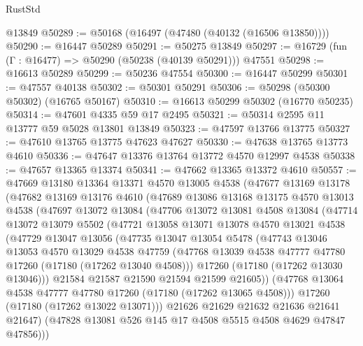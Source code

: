 \begin{lexlean}{RustStd}
\begin{coremodule}
{\begin{coremodule}
{{{{{{{{{{{{{{{{{{{{{{{{{{{{{{{{{{{{{{{{{{{{{{{{{{{{{{{    @13849
@50289 := @50168 (@16497 (@47480 (@40132 (@16506 @13850))))
@50290 := @16447 @50289
@50291 := @50275 @13849
@50297 := @16729 (fun (Γ : @16477) => @50290 (@50238 (@40139 @50291))) @47551
@50298 := @16613 @50289
@50299 := @50236 @47554
@50300 := @16447 @50299
@50301 := @47557 @40138
@50302 := @50301 @50291
@50306 := @50298 (@50300 @50302) (@16765 @50167)
@50310 := @16613 @50299 @50302 (@16770 @50235)
@50314 := @47601 @4335 @59 @17 @2495
@50321 := @50314 @2595 @11 @13777 @59 @5028 @13801 @13849
@50323 := @47597 @13766 @13775
@50327 := @47610 @13765 @13775 @47623 @47627
@50330 := @47638 @13765 @13773 @4610
@50336 := @47647 @13376 @13764 @13772 @4570 @12997 @4538
@50338 := @47657 @13365 @13374
@50341 := @47662 @13365 @13372 @4610
@50557 := @47669
    @13180
    @13364
    @13371
    @4570
    @13005
    @4538
    (@47677
      @13169
      @13178
      (@47682
        @13169
        @13176
        @4610
        (@47689
          @13086
          @13168
          @13175
          @4570
          @13013
          @4538
          (@47697
            @13072
            @13084
            (@47706
              @13072
              @13081
              @4508
              @13084
              (@47714
                @13072
                @13079
                @5502
                (@47721
                  @13058
                  @13071
                  @13078
                  @4570
                  @13021
                  @4538
                  (@47729
                    @13047
                    @13056
                    (@47735
                      @13047
                      @13054
                      @5478
                      (@47743
                        @13046
                        @13053
                        @4570
                        @13029
                        @4538
                        @47759
                        (@47768 @13039 @4538 @47777 @47780 @17260 (@17180 (@17262 @13040 @4508)))
                        @17260
                        (@17180 (@17262 @13030 @13046)))
                      @21584
                      @21587
                      @21590
                      @21594
                      @21599
                      @21605))
                  (@47768 @13064 @4538 @47777 @47780 @17260 (@17180 (@17262 @13065 @4508)))
                  @17260
                  (@17180 (@17262 @13022 @13071)))
                @21626
                @21629
                @21632
                @21636
                @21641
                @21647)
              (@47828 @13081 @526 @145 @17 @4508 @5515 @4508 @4629 @47847 @47856)))
}}}}}}}}}}}}}}}}}}}}}}}}}}}}}}}}}}}}}}}}}}}}}}}}}}}}}}}
\end{coremodule}}
\end{coremodule}
\end{lexlean}
